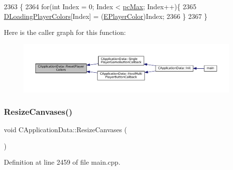 \begin{DoxyCode}
2363                                         \{
2364     \textcolor{keywordflow}{for}(\textcolor{keywordtype}{int} Index = 0; Index < \hyperlink{GameDataTypes_8h_aafb0ca75933357ff28a6d7efbdd7602fa594a5c8dd3987f24e8a0f23f1a72cd34}{pcMax}; Index++)\{
2365         \hyperlink{classCApplicationData_ab29b80d90f1201608dcb498cd627a6f9}{DLoadingPlayerColors}[Index] = (\hyperlink{GameDataTypes_8h_aafb0ca75933357ff28a6d7efbdd7602f}{EPlayerColor})Index;
2366     \}
2367 \}
\end{DoxyCode}
Here is the caller graph for this function\+:\nopagebreak
\begin{figure}[H]
\begin{center}
\leavevmode
\includegraphics[width=350pt]{classCApplicationData_a46653e8a3ed079f3921ec0257e49eb89_icgraph}
\end{center}
\end{figure}
\hypertarget{classCApplicationData_ad8b16ccb099b4996ce9fee34a407c091}{}\label{classCApplicationData_ad8b16ccb099b4996ce9fee34a407c091} 
\subsubsection{\texorpdfstring{Resize\+Canvases()}{ResizeCanvases()}}
{\footnotesize\ttfamily void C\+Application\+Data\+::\+Resize\+Canvases (\begin{DoxyParamCaption}{ }\end{DoxyParamCaption})\hspace{0.3cm}{\ttfamily [protected]}}



Definition at line 2459 of file main.\+cpp.


